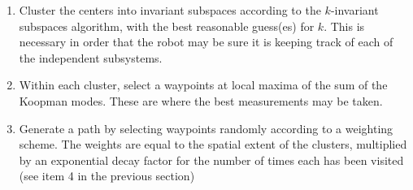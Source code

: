 \begin{enumerate}
	\item Cluster the centers into invariant subspaces according to the $k$-invariant subspaces algorithm, with the best reasonable guess(es) for $k$. This is necessary in order that the robot may be sure it is keeping track of each of the independent subsystems.
	\item Within each cluster, select a waypoints at local maxima of the sum of the Koopman modes. These are where the best measurements may be taken.
	\item Generate a path by selecting waypoints randomly according to a weighting scheme. The weights are equal to the spatial extent of the clusters, multiplied by an exponential decay factor for the number of times each has been visited (see item 4 in the previous section)
\end{enumerate}
